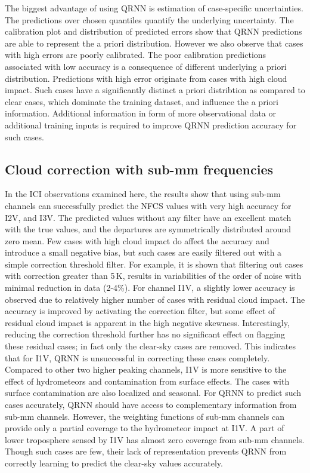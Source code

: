 \documentclass[amt, manuscript]{copernicus}
\begin{document}
The biggest advantage of using QRNN is estimation of case-specific uncertainties. The predictions over chosen quantiles quantify the underlying uncertainty. The calibration plot and distribution of predicted errors show that  QRNN predictions are able to represent the a priori distribution.  However we also observe that cases with high errors are poorly calibrated. The poor calibration predictions associated with low accuracy is a consequence of different underlying a priori distribution. Predictions with high error originate from cases with high cloud impact. Such cases have a significantly distinct a priori distribtion as compared to clear cases, which dominate the training dataset, and influence the a priori information. Additional information in form of more observational data or additional training inputs is required to improve QRNN prediction accuracy for such cases.  


\subsection{Cloud correction with sub-mm frequencies }
%
In the ICI observations examined here, the results show that using sub-mm channels can successfully predict the NFCS values with very high accuracy for I2V, and I3V. The predicted values without any filter have an excellent match with the true values, and the departures are symmetrically distributed around zero mean. Few cases with high cloud impact do affect the accuracy and introduce a small negative bias, but such cases are easily filtered out with a simple correction threshold filter. For example, it is shown that filtering out cases with correction greater than 5\,K, results in variabilities of the order of noise with minimal reduction in data (2-4\%). For channel I1V, a slightly lower accuracy is observed due to relatively higher number of cases with residual cloud impact. The accuracy is improved by activating the correction filter, but some effect of residual cloud impact is apparent in the high negative skewness. Interestingly, reducing the correction threshold further has no significant effect on flagging these residual cases; in fact only the clear-sky cases are removed. This indicates that for I1V, QRNN is unsuccessful in correcting these cases completely. Compared to other two higher peaking channels, I1V is more sensitive to the effect of hydrometeors  and contamination from surface effects. The cases with surface contamination are also localized and seasonal. For QRNN to predict such cases accurately, QRNN should have access to complementary information from sub-mm channels. However, the weighting functions of sub-mm channels can provide only a partial coverage to the hydrometeor impact at I1V. A part of lower troposphere sensed by I1V has almost zero coverage from sub-mm channels. Though such cases are few, their lack of representation prevents QRNN from correctly learning to predict the clear-sky values accurately.
\end{document}
